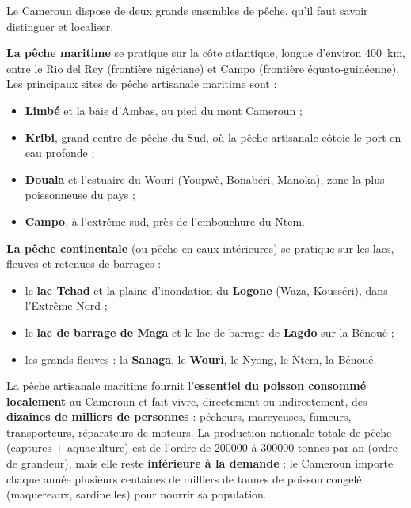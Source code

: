 \documentclass[11pt]{article}
\newcounter{popsec}
\newcounter{popsub}
\newcommand{\courssub}[1]{%
  \stepcounter{popsub}%
  \par\vspace{9pt}\noindent{\popxbold\fontsize{11.5}{13}\selectfont\color{popink}{\color{poporange}\thepopsec.\thepopsub}\hspace{6pt}#1}\par\nopagebreak\vspace{4pt}
}
\begin{document}
\courssub{Les zones de pêche du Cameroun}

Le Cameroun dispose de deux grands ensembles de pêche, qu'il faut savoir distinguer et localiser.

\textbf{La pêche maritime} se pratique sur la côte atlantique, longue d'environ \SI{400}{km}, entre le Rio del Rey (frontière nigériane) et Campo (frontière équato-guinéenne). Les principaux sites de pêche artisanale maritime sont :
\begin{itemize}
\item \textbf{Limbé} et la baie d'Ambas, au pied du mont Cameroun ;
\item \textbf{Kribi}, grand centre de pêche du Sud, où la pêche artisanale côtoie le port en eau profonde ;
\item \textbf{Douala} et l'estuaire du Wouri (Youpwè, Bonabéri, Manoka), zone la plus poissonneuse du pays ;
\item \textbf{Campo}, à l'extrême sud, près de l'embouchure du Ntem.
\end{itemize}

\textbf{La pêche continentale} (ou pêche en eaux intérieures) se pratique sur les lacs, fleuves et retenues de barrages :
\begin{itemize}
\item le \textbf{lac Tchad} et la plaine d'inondation du \textbf{Logone} (Waza, Kousséri), dans l'Extrême-Nord ;
\item le \textbf{lac de barrage de Maga} et le lac de barrage de \textbf{Lagdo} sur la Bénoué ;
\item les grands fleuves : la \textbf{Sanaga}, le \textbf{Wouri}, le Nyong, le Ntem, la Bénoué.
\end{itemize}

\begin{exemplebox}
La pêche artisanale maritime fournit l'\textbf{essentiel du poisson consommé localement} au Cameroun et fait vivre, directement ou indirectement, des \textbf{dizaines de milliers de personnes} : pêcheurs, mareyeuses, fumeurs, transporteurs, réparateurs de moteurs. La production nationale totale de pêche (captures + aquaculture) est de l'ordre de \num{200000} à \num{300000} tonnes par an (ordre de grandeur), mais elle reste \textbf{inférieure à la demande} : le Cameroun importe chaque année plusieurs centaines de milliers de tonnes de poisson congelé (maquereaux, sardinelles) pour nourrir sa population.
\end{exemplebox}
\end{document}
